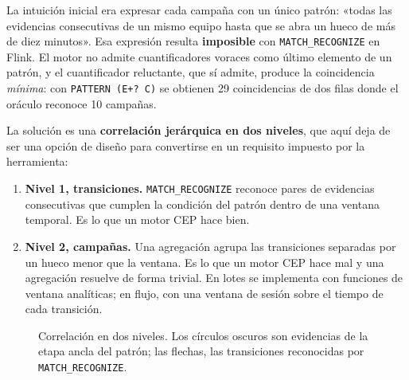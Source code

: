 La intuición inicial era expresar cada campaña con un único patrón: «todas las evidencias
consecutivas de un mismo equipo hasta que se abra un hueco de más de diez minutos». Esa
expresión resulta \textbf{imposible} con \texttt{MATCH\_RECOGNIZE} en Flink. El motor no
admite cuantificadores voraces como último elemento de un patrón, y el cuantificador
reluctante, que sí admite, produce la coincidencia \textit{mínima}: con
\texttt{PATTERN (E+? C)} se obtienen 29 coincidencias de dos filas donde el oráculo
reconoce 10 campañas.

La solución es una \textbf{correlación jerárquica en dos niveles}, que aquí deja de ser una
opción de diseño para convertirse en un requisito impuesto por la herramienta:

\begin{enumerate}
    \item \textbf{Nivel 1, transiciones.} \texttt{MATCH\_RECOGNIZE} reconoce pares de
    evidencias consecutivas que cumplen la condición del patrón dentro de una ventana
    temporal. Es lo que un motor CEP hace bien.
    \item \textbf{Nivel 2, campañas.} Una agregación agrupa las transiciones separadas por
    un hueco menor que la ventana. Es lo que un motor CEP hace mal y una agregación resuelve
    de forma trivial. En lotes se implementa con funciones de ventana analíticas; en flujo,
    con una ventana de sesión sobre el tiempo de cada transición.
\end{enumerate}

\begin{figure}[H]
\centering
{}
\caption{Correlación en dos niveles. Los círculos oscuros son evidencias de la etapa ancla
del patrón; las flechas, las transiciones reconocidas por \texttt{MATCH\_RECOGNIZE}.}
\label{fig:dos-niveles}
\end{figure}

